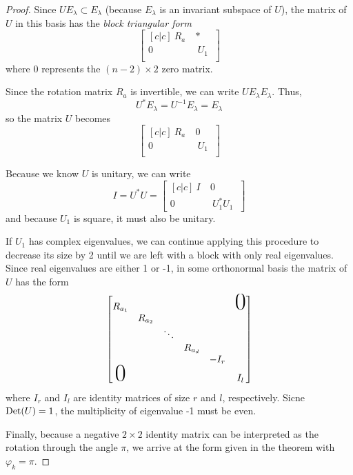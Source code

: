 \begin{proof}
Since $U E_{\lambda} \subset E_{\lambda}$ (because $E_{\lambda}$ is an invariant subspace of $U$), the matrix of $U$ in this basis has the \textit{block triangular form} 
$$\begin{bmatrix}[c|c]
 \: R_{a} \:  & * \\
\hline 
0 & \:  U_{1} \:  \\
\end{bmatrix}$$
where 0 represents the $(n - 2) \times 2$ zero matrix. 

Since the rotation matrix $R_{a}$ is invertible, we can write $UE_{\lambda} E_{\lambda}$. Thus, 
$$U^{*} E_{\lambda} = U^{-1} E_{\lambda} = E_{\lambda}$$
so the matrix $U$ becomes 
$$\begin{bmatrix}[c|c]
 \: R_{a} \:  & 0 \\
\hline 
0 & \:  U_{1} \:  \\
\end{bmatrix}$$

Because we know $U$ is unitary, we can write 
$$I = U^{*}U = \begin{bmatrix}[c|c]
\: I \: & 0 \\
\hline
0 & \: U_{1}^{*} U_{1} \:
\end{bmatrix}$$
and because $U_{1}$ is square, it must also be unitary. 

If $U_{1}$ has complex eigenvalues, we can continue applying this procedure to decrease its size by 2 until we are left with a block with only real eigenvalues. Since real eigenvalues are either 1 or -1, in some orthonormal basis the matrix of $U$ has the form 
$$\begin{bmatrix}
R_{a_{1}} & & & & & \makebox{\Huge 0} \\
 & R_{a_{2}} & & & \\ 
 & & \ddots & & \\
 & & & R_{a_{d}} & \\
 & & & & -I_{r} & \\
 \makebox{\Huge 0} & & & & & I_{l}
\end{bmatrix}$$
where $I_{r}$ and $I_{l}$ are identity matrices of size $r$ and $l$, respectively. Sicne $\operatorname{Det}(U) = 1$, the multiplicity of eigenvalue -1 must be even. 

Finally, because a negative $2 \times 2$ identity matrix can be interpreted as the rotation through the angle $\pi$, we arrive at the form given in the theorem with $\varphi_{k} = \pi$. 
\end{proof}